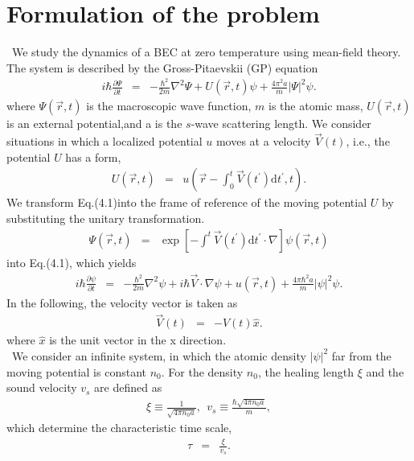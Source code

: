 \documentclass[12pt,a4paper]{report} %
\newcommand{\diff}{\mathrm{d}}				%
\begin{document}
\section{Formulation of the problem}
\ We study the dynamics of a BEC at zero temperature
using mean-field theory. The system is described by the
Gross-Pitaevskii (GP) equation
\begin{eqnarray}
i \hbar \frac{\partial \Psi}{\partial t} & = &
- \frac{\hbar^2}{2m} \nabla^2 \Psi + U(\vec{r},t)\psi + \frac{4 \pi^2 a}{m} | \Psi |^2 \psi.
\end{eqnarray}
where $\Psi(\vec{r},t)$ is the macroscopic wave function, $m$ is the
atomic mass, $U( \vec{r}, t)$ is an external potential,and a is 
the $s$-wave scattering length. We consider situations in
which a localized potential $u$ moves at a velocity $\vec{V}(t)$,
i.e., the potential $U$ has a form,
\begin{eqnarray}
U(\vec{r},t) & = & u \left( \vec{r} - \int_0^t \vec{V}(t^\prime) \diff t^\prime, t \right).
\end{eqnarray}
We transform Eq.(4.1)into the frame of reference of the
moving potential $U$ by substituting the unitary transformation.
\begin{eqnarray}
\Psi \left( \vec{r}, t \right) & = & \exp \left[ - \int^t \vec{V} \left( t^\prime \right) \diff t^\prime \cdot \nabla \right]
\psi \left( \vec{r}, t \right)
\end{eqnarray}
into Eq.(4.1), which yields
\begin{eqnarray}
i \hbar \frac{\partial \psi}{\partial t} & = &
- \frac{\hbar^2}{2m} \nabla^2 \psi + i \hbar \vec{V} \cdot \nabla \psi
+ u \left( \vec{r}, t \right) + \frac{4 \pi \hbar^2 a}{m} | \psi |^2 \psi .
\end{eqnarray}
In the following, the velocity vector is taken as
\begin{eqnarray}
\vec{V} (t) & = & - V(t) \hat{x}.
\end{eqnarray}
where $\hat{x}$ is the unit vector in the x direction.
\\
\ We consider an infinite system, in which the atomic
density $| \psi |^2$ far from the moving potential is 
constant $n_0$. For the density $n_0$, the healing length
$\xi$ and the sound velocity $v_s$ are defined as
\begin{eqnarray}
\xi \equiv \frac{1}{\sqrt{4 \pi n_0 a}}, \ \ v_s \equiv \frac{\hbar \sqrt{4 \pi n_0 a}}{m},
\end{eqnarray}
which determine the characteristic time scale,
\begin{eqnarray}
\tau & = & \frac{\xi}{v_s}.
\end{eqnarray}
\end{document}
